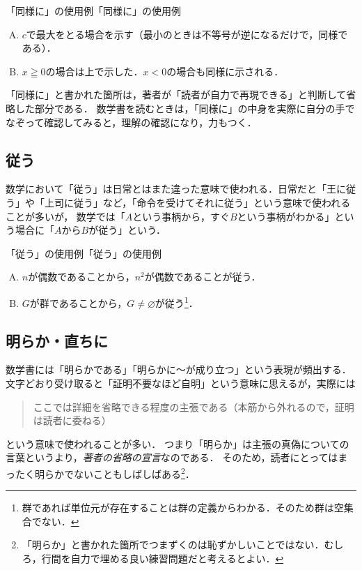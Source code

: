 \begin{example}{「同様に」の使用例}{「同様に」の使用例}
  \begin{enumerate}[(A)]
    \item $c$で最大をとる場合を示す（最小のときは不等号が逆になるだけで，同様である）．
    \item $x \geqq 0$の場合は上で示した．$x<0$の場合も同様に示される．
  \end{enumerate}
\end{example}

「同様に」と書かれた箇所は，著者が「読者が自力で再現できる」と判断して省略した部分である．
数学書を読むときは，「同様に」の中身を実際に自分の手でなぞって確認してみると，理解の確認になり，力もつく．

\subsection{従う}

数学において「従う」は日常とはまた違った意味で使われる．日常だと「王に従う」や「上司に従う」など，「命令を受けてそれに従う」という意味で使われることが多いが，
数学では「$A$という事柄から，すぐ$B$という事柄がわかる」という場合に「$A$から$B$が従う」という．

\begin{example}{「従う」の使用例}{「従う」の使用例}
  \begin{enumerate}[(A)]
    \item $n$が偶数であることから，$n^2$が偶数であることが従う．\label{enu:偶数ならば偶数}
    \item $G$が群であることから，$G \ne \varnothing$が従う\footnote{群であれば単位元が存在することは群の定義からわかる．そのため群は空集合でない．}．\label{enu:群の例}
  \end{enumerate}
\end{example}

\subsection{明らか・直ちに}

数学書には「明らかである」「明らかに〜が成り立つ」という表現が頻出する．
文字どおり受け取ると「証明不要なほど自明」という意味に思えるが，実際には
\begin{quote}
  ここでは詳細を省略できる程度の主張である（本筋から外れるので，証明は読者に委ねる）
\end{quote}
という意味で使われることが多い．
つまり「明らか」は主張の真偽についての言葉というより，\emph{著者の省略の宣言}なのである．
そのため，読者にとってはまったく明らかでないこともしばしばある\footnote{「明らか」と書かれた箇所でつまずくのは恥ずかしいことではない．むしろ，行間を自力で埋める良い練習問題だと考えるとよい．}．

